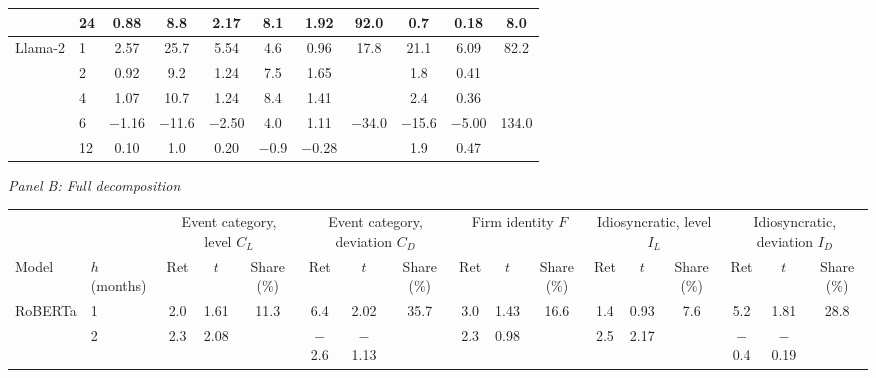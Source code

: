 \begin{table}[htbp]
{\begin{adjustbox}{max width=\linewidth, max totalheight=0.28\textheight}
\begin{tabular}{llccccccccc}
 & 24 & \phantom{$-$}0.88 & \phantom{$-$0}8.8 & \phantom{$-$}2.17 & \phantom{$-$}8.1 & \phantom{$-$}1.92 & \phantom{$-$}92.0 & \phantom{$-$0}0.7 & \phantom{$-$}0.18 & \phantom{00}8.0 \\
\midrule
Llama-2 & 1 & \phantom{$-$}2.57 & \phantom{$-$}25.7 & \phantom{$-$}5.54 & \phantom{$-$}4.6 & \phantom{$-$}0.96 & \phantom{$-$}17.8 & \phantom{$-$}21.1 & \phantom{$-$}6.09 & \phantom{0}82.2 \\
 & 2 & \phantom{$-$}0.92 & \phantom{$-$0}9.2 & \phantom{$-$}1.24 & \phantom{$-$}7.5 & \phantom{$-$}1.65 &  & \phantom{$-$0}1.8 & \phantom{$-$}0.41 &  \\
 & 4 & \phantom{$-$}1.07 & \phantom{$-$}10.7 & \phantom{$-$}1.24 & \phantom{$-$}8.4 & \phantom{$-$}1.41 &  & \phantom{$-$0}2.4 & \phantom{$-$}0.36 &  \\
 & 6 & $-$1.16 & $-$11.6 & $-$2.50 & \phantom{$-$}4.0 & \phantom{$-$}1.11 & $-$34.0 & $-$15.6 & $-$5.00 & 134.0 \\
 & 12 & \phantom{$-$}0.10 & \phantom{$-$0}1.0 & \phantom{$-$}0.20 & $-$0.9 & $-$0.28 &  & \phantom{$-$0}1.9 & \phantom{$-$}0.47 &  \\
\bottomrule
\end{tabular}
\end{adjustbox}
\par\medskip
\textit{Panel B: Full decomposition}\\[2pt]
\begin{adjustbox}{max width=\linewidth, max totalheight=0.28\textheight}
\begin{tabular}{llccccccccccccccc}
\toprule
\multicolumn{2}{c}{} & \multicolumn{3}{c}{Event category, level $C_L$} & \multicolumn{3}{c}{Event category, deviation $C_D$} & \multicolumn{3}{c}{Firm identity $F$} & \multicolumn{3}{c}{Idiosyncratic, level $I_L$} & \multicolumn{3}{c}{Idiosyncratic, deviation $I_D$} \\
\cmidrule(lr){3-5} \cmidrule(lr){6-8} \cmidrule(lr){9-11} \cmidrule(lr){12-14} \cmidrule(lr){15-17}
Model & $h$ (months) & Ret & $t$ & Share (\%) & Ret & $t$ & Share (\%) & Ret & $t$ & Share (\%) & Ret & $t$ & Share (\%) & Ret & $t$ & Share (\%) \\
\midrule
RoBERTa & 1 & \phantom{$-$}2.0 & \phantom{$-$}1.61 & \phantom{$-$}11.3 & \phantom{$-$0}6.4 & \phantom{$-$}2.02 & \phantom{$-$}35.7 & \phantom{$-$}3.0 & \phantom{$-$}1.43 & 16.6 & 1.4 & 0.93 & \phantom{$-$0}7.6 & \phantom{$-$0}5.2 & \phantom{$-$}1.81 & 28.8 \\
 & 2 & \phantom{$-$}2.3 & \phantom{$-$}2.08 &  & \phantom{0}$-$2.6 & $-$1.13 &  & \phantom{$-$}2.3 & \phantom{$-$}0.98 &  & 2.5 & 2.17 &  & \phantom{0}$-$0.4 & $-$0.19 &  \\

\end{tabular}
\end{adjustbox}}
\end{table}
